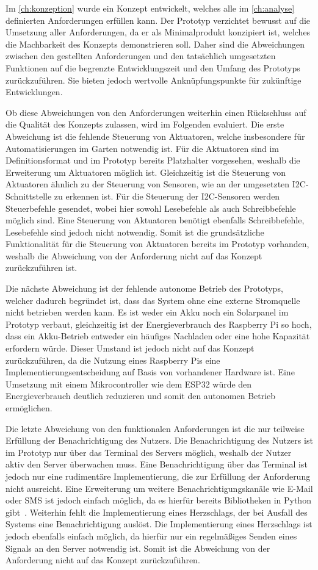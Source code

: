 Im \cref{ch:konzeption} wurde ein Konzept entwickelt, welches alle im \cref{ch:analyse} definierten Anforderungen erfüllen kann.
Der Prototyp verzichtet bewusst auf die Umsetzung aller Anforderungen, da er als Minimalprodukt konzipiert ist, welches die Machbarkeit des Konzepts demonstrieren soll.
Daher sind die Abweichungen zwischen den gestellten Anforderungen und den tatsächlich umgesetzten Funktionen auf die begrenzte Entwicklungszeit und den Umfang des Prototyps zurückzuführen.
Sie bieten jedoch wertvolle Anknüpfungspunkte für zukünftige Entwicklungen.

Ob diese Abweichungen von den Anforderungen weiterhin einen Rückschluss auf die Qualität des Konzepts zulassen, wird im Folgenden evaluiert.
Die erste Abweichung ist die fehlende Steuerung von Aktuatoren, welche insbesondere für Automatisierungen im Garten notwendig ist.
Für die Aktuatoren sind im Definitionsformat und im Prototyp bereits Platzhalter vorgesehen, weshalb die Erweiterung um Aktuatoren möglich ist.
Gleichzeitig ist die Steuerung von Aktuatoren ähnlich zu der Steuerung von Sensoren, wie an der umgesetzten I2C-Schnittstelle zu erkennen ist.
Für die Steuerung der I2C-Sensoren werden Steuerbefehle gesendet, wobei hier sowohl Lesebefehle als auch Schreibbefehle möglich sind.
Eine Steuerung von Aktuatoren benötigt ebenfalls Schreibbefehle, Lesebefehle sind jedoch nicht notwendig.
Somit ist die grundsätzliche Funktionalität für die Steuerung von Aktuatoren bereits im Prototyp vorhanden, weshalb die Abweichung von der Anforderung nicht auf das Konzept zurückzuführen ist.

Die nächste Abweichung ist der fehlende autonome Betrieb des Prototyps, welcher dadurch begründet ist, dass das System ohne eine externe Stromquelle nicht betrieben werden kann.
Es ist weder ein Akku noch ein Solarpanel im Prototyp verbaut, gleichzeitig ist der Energieverbrauch des Raspberry Pi so hoch, dass ein Akku-Betrieb entweder ein häufiges Nachladen oder eine hohe Kapazität erfordern würde.
Dieser Umstand ist jedoch nicht auf das Konzept zurückzuführen, da die Nutzung eines Raspberry Pis eine Implementierungsentscheidung auf Basis von vorhandener Hardware ist.
Eine Umsetzung mit einem Mikrocontroller wie dem ESP32 würde den Energieverbrauch deutlich reduzieren und somit den autonomen Betrieb ermöglichen.

Die letzte Abweichung von den funktionalen Anforderungen ist die nur teilweise Erfüllung der Benachrichtigung des Nutzers.
Die Benachrichtigung des Nutzers ist im Prototyp nur über das Terminal des Servers möglich, weshalb der Nutzer aktiv den Server überwachen muss.
Eine Benachrichtigung über das Terminal ist jedoch nur eine rudimentäre Implementierung, die zur Erfüllung der Anforderung nicht ausreicht.
Eine Erweiterung um weitere Benachrichtigungskanäle wie E-Mail oder SMS ist jedoch einfach möglich, da es hierfür bereits Bibliotheken in Python gibt~\cite{PythonEmail, PythonSMTP, PythonSMS}.
Weiterhin fehlt die Implementierung eines Herzschlags, der bei Ausfall des Systems eine Benachrichtigung auslöst.
Die Implementierung eines Herzschlags ist jedoch ebenfalls einfach möglich, da hierfür nur ein regelmäßiges Senden eines Signals an den Server notwendig ist.
Somit ist die Abweichung von der Anforderung nicht auf das Konzept zurückzuführen.


